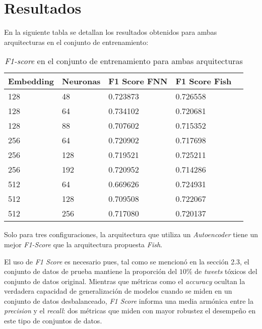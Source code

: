\section{Resultados}


En la siguiente tabla se detallan los resultados obtenidos para ambas arquitecturas en el conjunto de entrenamiento:

\begin{table}[h]
\begin{tabularx}{.45\textwidth}{||l|X|X|X|X||}
\hline
Embedding & Neuronas & F1 Score FNN & F1 Score Fish                  \\ \hline\hline
128       &    48    & 0.723873     & 0.726558 \cellcolor{green!20}  \\ \hline
128       &    64    & 0.734102     & 0.720681 \cellcolor{red!30}    \\ \hline
128       &    88    & 0.707602     & 0.715352 \cellcolor{green!20}  \\ \hline               
256       &    64    & 0.720902     & 0.717698 \cellcolor{red!30}    \\ \hline
256       &    128   & 0.719521     & 0.725211 \cellcolor{green!20}  \\ \hline
256       &    192   & 0.720952     & 0.714286 \cellcolor{red!30}    \\ \hline
512       &    64    & 0.669626     & 0.724931 \cellcolor{green!20}  \\ \hline
512       &    128   & 0.709508     & 0.722067 \cellcolor{green!20}  \\ \hline
512       &    256   & 0.717080     & 0.720137 \cellcolor{green!20}  \\ \hline
\end{tabularx}
\caption{\label{fig:resultados-fish} \textit{F1-score} en el conjunto de entrenamiento para ambas arquitecturas}
\end{table}

Solo para tres configuraciones, la arquitectura que utiliza un \textit{Autoencoder} tiene un mejor \textit{F1-Score} que la arquitectura propuesta \textit{Fish}.

El uso de \textit{F1 Score} es necesario pues, tal como se mencionó en la sección 2.3, el conjunto de datos de prueba mantiene la proporción del $10\%$ de \textit{tweets} tóxicos del conjunto de datos original. Mientras que métricas como el \textit{accuracy} ocultan la verdadera capacidad de generalización de modelos cuando se miden en un conjunto de datos desbalanceado, \textit{F1 Score} informa una media armónica entre la \textit{precision} y el \textit{recall}: dos métricas que miden con mayor robustez el desempeño en este tipo de conjuntos de datos.